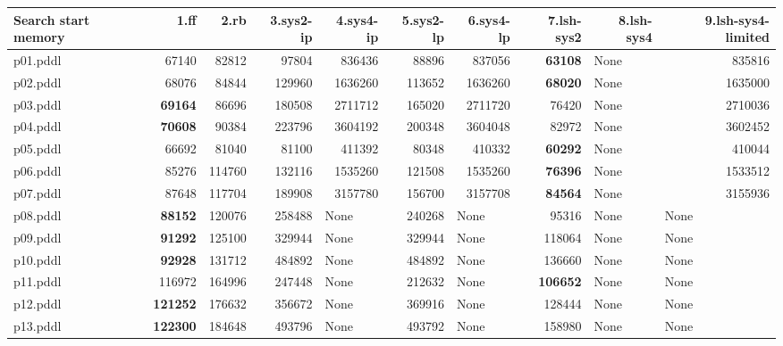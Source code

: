 \documentclass{article}
\begin{document}
\begin{tabular}{@{}lrrrrrrrrr@{}}
Search start memory & 1.ff & 2.rb & 3.sys2-ip & 4.sys4-ip & 5.sys2-lp & 6.sys4-lp & 7.lsh-sys2 & 8.lsh-sys4 & 9.lsh-sys4-limited \\
\midrule
p01.pddl & 67140 & 82812 & 97804 & 836436 & 88896 & 837056 & \textbf{63108} & \multicolumn{1}{|l|}{None} & 835816 \\
p02.pddl & 68076 & 84844 & 129960 & 1636260 & 113652 & 1636260 & \textbf{68020} & \multicolumn{1}{|l|}{None} & 1635000 \\
p03.pddl & \textbf{69164} & 86696 & 180508 & 2711712 & 165020 & 2711720 & 76420 & \multicolumn{1}{|l|}{None} & 2710036 \\
p04.pddl & \textbf{70608} & 90384 & 223796 & 3604192 & 200348 & 3604048 & 82972 & \multicolumn{1}{|l|}{None} & 3602452 \\
p05.pddl & 66692 & 81040 & 81100 & 411392 & 80348 & 410332 & \textbf{60292} & \multicolumn{1}{|l|}{None} & 410044 \\
p06.pddl & 85276 & 114760 & 132116 & 1535260 & 121508 & 1535260 & \textbf{76396} & \multicolumn{1}{|l|}{None} & 1533512 \\
p07.pddl & 87648 & 117704 & 189908 & 3157780 & 156700 & 3157708 & \textbf{84564} & \multicolumn{1}{|l|}{None} & 3155936 \\
p08.pddl & \textbf{88152} & 120076 & 258488 & \multicolumn{1}{|l|}{None} & 240268 & \multicolumn{1}{|l|}{None} & 95316 & \multicolumn{1}{|l|}{None} & \multicolumn{1}{|l|}{None} \\
p09.pddl & \textbf{91292} & 125100 & 329944 & \multicolumn{1}{|l|}{None} & 329944 & \multicolumn{1}{|l|}{None} & 118064 & \multicolumn{1}{|l|}{None} & \multicolumn{1}{|l|}{None} \\
p10.pddl & \textbf{92928} & 131712 & 484892 & \multicolumn{1}{|l|}{None} & 484892 & \multicolumn{1}{|l|}{None} & 136660 & \multicolumn{1}{|l|}{None} & \multicolumn{1}{|l|}{None} \\
p11.pddl & 116972 & 164996 & 247448 & \multicolumn{1}{|l|}{None} & 212632 & \multicolumn{1}{|l|}{None} & \textbf{106652} & \multicolumn{1}{|l|}{None} & \multicolumn{1}{|l|}{None} \\
p12.pddl & \textbf{121252} & 176632 & 356672 & \multicolumn{1}{|l|}{None} & 369916 & \multicolumn{1}{|l|}{None} & 128444 & \multicolumn{1}{|l|}{None} & \multicolumn{1}{|l|}{None} \\
p13.pddl & \textbf{122300} & 184648 & 493796 & \multicolumn{1}{|l|}{None} & 493792 & \multicolumn{1}{|l|}{None} & 158980 & \multicolumn{1}{|l|}{None} & \multicolumn{1}{|l|}{None} \\

\end{tabular}
\end{document}
